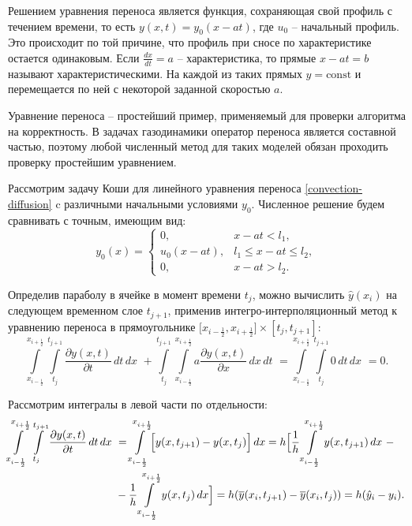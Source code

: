 \documentclass[12pt,a4paper]{article}
\newcommand{\half}{\frac{1}{2}}
\begin{document}
    Решением уравнения переноса является функция, сохраняющая свой профиль с течением времени, то есть $ y(x, t) = y_0(x-at) $, где $ u_0 $ -- начальный профиль. Это происходит по той причине, что профиль при сносе по характеристике остается одинаковым. Если $\frac{dx}{dt} = a $ -- характеристика, то прямые $ x-at = b $ называют характеристическими. На каждой из таких прямых $ y = \text{const} $ и перемещается по ней с некоторой заданной скоростью $ a $. 

    Уравнение переноса – простейший пример, применяемый для проверки алгоритма на корректность. В задачах газодинамики оператор переноса является составной частью, поэтому любой численный метод для таких моделей обязан проходить проверку простейшим уравнением.

    Рассмотрим задачу Коши для линейного уравнения переноса \eqref{convection-diffusion} c различными начальными условиями $ y_0.$ Численное решение будем сравнивать с точным, имеющим вид: 
    \[  y_0(x) = 
         \begin{cases}
            0, & x - at < l_1, \\
            u_0(x-at), & l_1 \leq x-at \leq l_2, \\
            0, & x-at > l_2.
         \end{cases} 
    \]

    Определив параболу в ячейке в момент времени $ t_j $, можно вычислить $ \hat y(x_i) $ на следующем временном слое $ t_{j+1} $, применив интегро-интерполяционный метод к уравнению переноса в прямоугольнике $ \bigl[ x_{i-\half}, x_{i+\half} \bigr] \times [t_j, t_{j+1}] $: 
    \[
        \int \limits_{x_{i-\half}}^{x_{i+\half}} \int \limits_{t_j}^{t_{j+1}} \dfrac{ \partial y(x, t) }{ \partial t } \, dt \, dx \,\, + \int \limits_{t_j}^{t_{j+1}} \int \limits_{x_{i-\half}}^{x_{i+\half}} a \dfrac{ \partial y(x,t) }{ \partial x } \, dx \, dt \,\, = \int \limits_{x_{i-\half}}^{x_{i+\half}} \int \limits_{t_j}^{t_{j+1}} 0 \, dt \, dx \, \, = 0.
    \]

    Рассмотрим интегралы в левой части по отдельности: 
    \[
         \begin{split}
            \int \limits_{x_{i-\half}}^{x_{i+\half}} \int \limits_{t_j}^{t_{j+1}} \dfrac{ \partial y(x, t) }{ \partial t } \, dt \, dx \,\, &= \int \limits_{x_{i-\half}}^{x_{i+\half}} \Bigl[ y(x, t_{j+1}) - y(x, t_j)  \Bigr] \, dx = h \Bigl[ \dfrac{1}{h} \int \limits_{x_{i-\half}}^{x_{i+\half}} y(x, t_{j+1}) \, dx \,\,  -  \\ 
            &- \dfrac{1}{h} \int \limits_{x_{i-\half}}^{x_{i+\half}} y(x, t_j) \, dx \Bigr] = h ( \overline y(x_i, t_{j+1}) - \overline y(x_i, t_j) ) = h( \hat y_i - y_i).
         \end{split}
    \]
\end{document}
